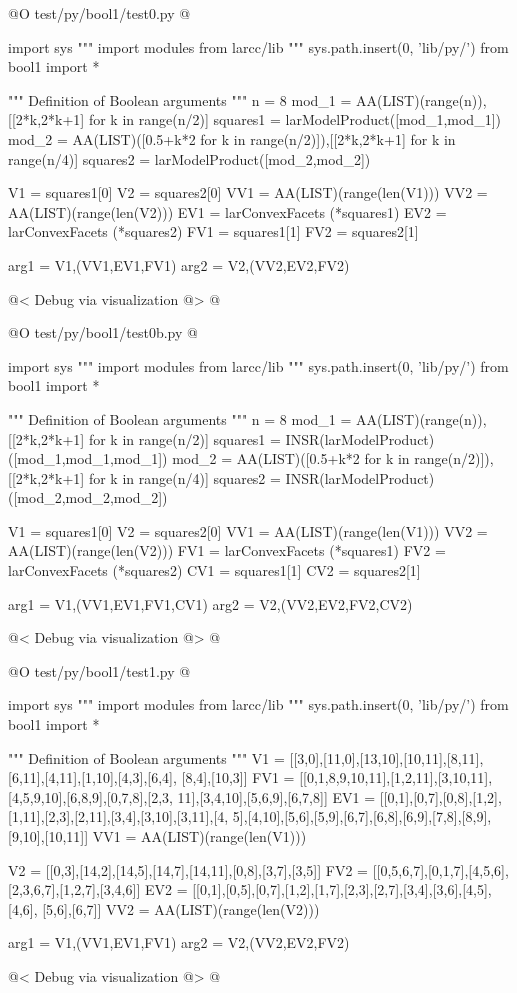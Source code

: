 \documentclass[11pt,oneside]{article}	%
\begin{document}
@O test/py/bool1/test0.py
@{
import sys
""" import modules from larcc/lib """
sys.path.insert(0, 'lib/py/')
from bool1 import *

""" Definition of Boolean arguments """
n = 8
mod_1 = AA(LIST)(range(n)), [[2*k,2*k+1] for k in range(n/2)]
squares1 = larModelProduct([mod_1,mod_1])
mod_2 = AA(LIST)([0.5+k*2 for k in range(n/2)]),[[2*k,2*k+1] for k in range(n/4)]
squares2 = larModelProduct([mod_2,mod_2])

V1 = squares1[0]
V2 = squares2[0]
VV1 = AA(LIST)(range(len(V1)))
VV2 = AA(LIST)(range(len(V2)))
EV1 = larConvexFacets (*squares1)
EV2 = larConvexFacets (*squares2)
FV1 = squares1[1]
FV2 = squares2[1]

arg1 = V1,(VV1,EV1,FV1)
arg2 = V2,(VV2,EV2,FV2)

@< Debug via visualization @>
@}
@O test/py/bool1/test0b.py
@{
import sys
""" import modules from larcc/lib """
sys.path.insert(0, 'lib/py/')
from bool1 import *

""" Definition of Boolean arguments """
n = 8
mod_1 = AA(LIST)(range(n)), [[2*k,2*k+1] for k in range(n/2)]
squares1 = INSR(larModelProduct)([mod_1,mod_1,mod_1])
mod_2 = AA(LIST)([0.5+k*2 for k in range(n/2)]),[[2*k,2*k+1] for k in range(n/4)]
squares2 = INSR(larModelProduct)([mod_2,mod_2,mod_2])

V1 = squares1[0]
V2 = squares2[0]
VV1 = AA(LIST)(range(len(V1)))
VV2 = AA(LIST)(range(len(V2)))
FV1 = larConvexFacets (*squares1)
FV2 = larConvexFacets (*squares2)
CV1 = squares1[1]
CV2 = squares2[1]

arg1 = V1,(VV1,EV1,FV1,CV1)
arg2 = V2,(VV2,EV2,FV2,CV2)

@< Debug via visualization @>
@}

@O test/py/bool1/test1.py
@{
import sys
""" import modules from larcc/lib """
sys.path.insert(0, 'lib/py/')
from bool1 import *

""" Definition of Boolean arguments """
V1 = [[3,0],[11,0],[13,10],[10,11],[8,11],[6,11],[4,11],[1,10],[4,3],[6,4],
		[8,4],[10,3]]
FV1 = [[0,1,8,9,10,11],[1,2,11],[3,10,11],[4,5,9,10],[6,8,9],[0,7,8],[2,3,
		11],[3,4,10],[5,6,9],[6,7,8]]
EV1 = [[0,1],[0,7],[0,8],[1,2],[1,11],[2,3],[2,11],[3,4],[3,10],[3,11],[4,
		5],[4,10],[5,6],[5,9],[6,7],[6,8],[6,9],[7,8],[8,9],[9,10],[10,11]]
VV1 = AA(LIST)(range(len(V1)))

V2 = [[0,3],[14,2],[14,5],[14,7],[14,11],[0,8],[3,7],[3,5]]
FV2 = [[0,5,6,7],[0,1,7],[4,5,6],[2,3,6,7],[1,2,7],[3,4,6]]
EV2 = [[0,1],[0,5],[0,7],[1,2],[1,7],[2,3],[2,7],[3,4],[3,6],[4,5],[4,6],
		[5,6],[6,7]]
VV2 = AA(LIST)(range(len(V2)))

arg1 = V1,(VV1,EV1,FV1)
arg2 = V2,(VV2,EV2,FV2)

@< Debug via visualization @>
@}
\end{document}
